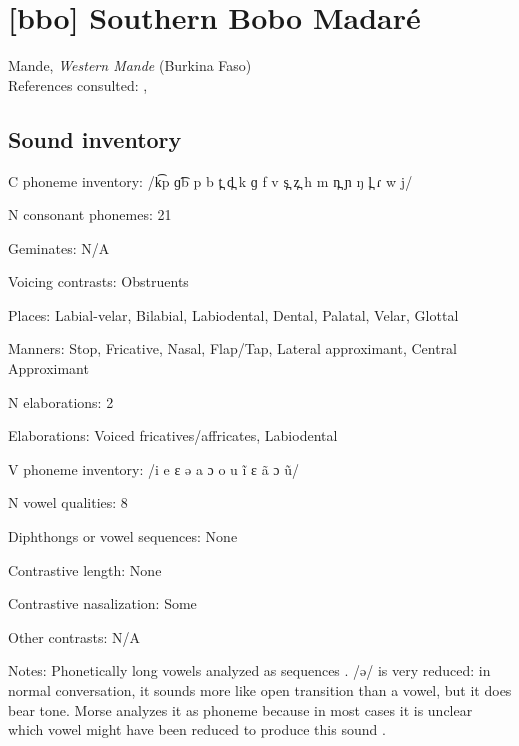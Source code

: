 {\section*{[bbo] Southern Bobo Madaré}  %
Mande, \textit{Western Mande} (Burkina Faso)\medskip\\
References consulted: \citet{Morse1976}, \citet{Sanou1978}

\subsection*{Sound inventory}
\begin{appendixdesc}

\item[C phoneme inventory:] /k͡p ɡ͡b p b t̪ d̪ k ɡ f v s̪ z̪ h m n̪ ɲ ŋ l̪ ɾ w j/

\item[N consonant phonemes:] 21

\item[Geminates:] N/A

\item[Voicing contrasts:] Obstruents

\item[Places:] Labial-velar, Bilabial, Labiodental, Dental, Palatal, Velar, Glottal

\item[Manners:] Stop, Fricative, Nasal, Flap/Tap, Lateral approximant, Central Approximant

\item[N elaborations:] 2

\item[Elaborations:] Voiced fricatives/affricates, Labiodental

\item[V phoneme inventory:] /i e ɛ ə a ɔ o u ĩ ɛ ã ɔ ũ/

\item[N vowel qualities:] 8

\item[Diphthongs or vowel sequences:] None

\item[Contrastive length:] None

\item[Contrastive nasalization:] Some

\item[Other contrasts:] N/A

\item[Notes:] Phonetically long vowels analyzed as sequences \citep[100--105]{Morse1976}. /ə/ is very reduced: in normal conversation, it sounds more like open transition than a vowel, but it does bear tone. Morse analyzes it as phoneme because in most cases it is unclear which vowel might have been reduced to produce this sound \citep[42--45]{Morse1976}.
\end{appendixdesc}
}
